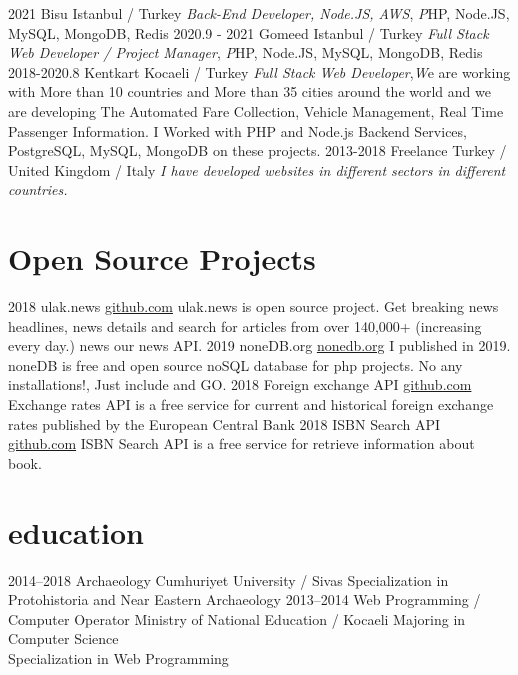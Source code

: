 \documentclass[]{friggeri-cv}
\begin{document}
\begin{entrylist}
  \entry
    {2021}
    {Bisu}
    {Istanbul / Turkey}
    {\emph{Back-End Developer, Node.JS, AWS}, \emph 
 PHP, Node.JS, MySQL, MongoDB, Redis}
  \entry
    {2020.9 - 2021}
    {Gomeed}
    {Istanbul / Turkey}
    {\emph{Full Stack Web Developer / Project Manager}, \emph 
 PHP, Node.JS, MySQL, MongoDB, Redis}
  \entry
    {2018-2020.8}
    {Kentkart}
    {Kocaeli / Turkey}
    {\emph{Full Stack Web Developer},\emph We are working with More than 10 countries and More than 35 cities around the world and we are developing The Automated Fare Collection, Vehicle Management, Real Time Passenger Information.
I Worked with PHP and Node.js Backend Services, PostgreSQL, MySQL, MongoDB on these projects.}
  \entry
    {2013-2018}
    {Freelance}
    {Turkey / United Kingdom / Italy}
    {\emph{I have developed websites in different sectors in different countries.}}
\end{entrylist}

\section{Open Source Projects}

\begin{entrylist}
  \entry
     {2018}
    {ulak.news}
    {\href{https://github.com/orhanayd/ulak.news}{github.com}}
    {ulak.news is open source project. Get breaking news headlines, news details and search for articles from over 140,000+ (increasing every day.) news our news API. }
  \entry
    {2019}
    {noneDB.org}
    {\href{https://github.com/orhanayd/noneDB}{nonedb.org}}
    {I published in 2019. noneDB is free and open source noSQL database for php projects. No any installations!, Just include and GO.}
  \entry
    {2018}
    {Foreign exchange API}
    {\href{https://github.com/orhanayd/Foreign-exchange-API}{github.com}}
    {Exchange rates API is a free service for current and historical foreign exchange rates
published by the European Central Bank}
  \entry
    {2018}
    {ISBN Search API}
    {\href{https://github.com/orhanayd/isbn-search}{github.com}}
    {ISBN Search API is a free service for retrieve information about book.}
\end{entrylist}

\cleardoublepage

\section{education}

\begin{entrylist}
  \entry
    {2014–2018}
    {Archaeology}
    {Cumhuriyet University / Sivas}
    {Specialization in Protohistoria and Near Eastern Archaeology}
  \entry
    {2013–2014}
    {Web Programming / Computer Operator}
    {Ministry of National Education / Kocaeli}
    {Majoring in Computer Science\\
    Specialization in Web Programming}
\end{entrylist}
\end{document}

